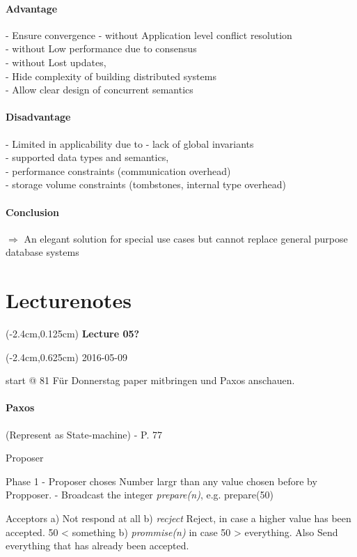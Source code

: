 \documentclass[a4paper,12pt]{article}%
\newif\ifcomment
\newcommand{\lecture}[2]{\color{black} 
	
	\begin{textblock*}{3cm}(-2.4cm,0.125cm)
		{\bf Lecture {#1}}
	\end{textblock*}
	
	\begin{textblock*}{3cm}(-2.4cm,0.625cm)
		#2
	\end{textblock*}
}
\begin{document}
\paragraph{Advantage}
- Ensure convergence 
- without Application level conflict resolution\\
- without Low performance due to consensus\\
- without Lost updates,\\
- Hide complexity of building distributed systems\\
- Allow clear design of concurrent semantics\\

\paragraph{Disadvantage} 
- Limited in applicability due to - lack of global invariants\\
- supported data types and semantics,\\
- performance constraints (communication overhead)\\
- storage volume constraints (tombstones, internal type overhead)

\paragraph{Conclusion}
$\Rightarrow$ An elegant solution for special use cases but cannot replace general purpose database systems

\newpage

\ifcomment
\section{Lecturenotes}
\lecture{05?}{2016-05-09} start @ 81
Für Donnerstag paper mitbringen und Paxos anschauen.
\paragraph{Paxos} (Represent as State-machine) - P. 77


Proposer


Phase 1
- Proposer choses Number largr than any value chosen before by Propposer. 
- Broadcast the integer {\it prepare(n)}, e.g. prepare(50)

Acceptors
a) Not respond at all
b) {\it recject} Reject, in case a higher value has been accepted. 50 < something
b) {\it prommise(n)} in case 50 > everything. Also Send everything that has already been accepted.
\end{document}
